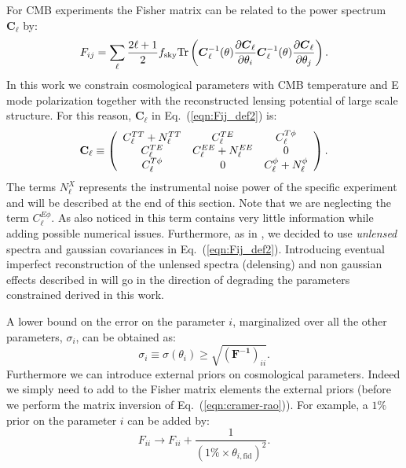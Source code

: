 \documentclass[aps,prd,reprint,superscriptaddress]{revtex4-1}
\newcommand\refeq[1]{Eq.~(\ref{eqn:#1})}
\begin{document}
For CMB experiments the Fisher matrix can be related to the power spectrum $\boldsymbol{C}_\ell$ by:
\begin{equation}
 F_{ij} = \sum_\ell \frac{2\ell+1}{2} f_{\rm sky} {\rm Tr} \left(  \boldsymbol{C}^{-1}_\ell( \theta) \frac{\partial \boldsymbol{C}_\ell}{\partial \theta_i} \boldsymbol{C}^{-1}_\ell( \theta) \frac{\partial \boldsymbol{C}_\ell}{\partial \theta_j}  \right).
 \label{eqn:Fij_def2}
 \end{equation}
In this work we constrain cosmological parameters with CMB temperature and E mode polarization together with the reconstructed lensing potential of large scale structure. For this reason, $\boldsymbol{C}_\ell$ in \refeq{Fij_def2} is:
 \begin{eqnarray}
 	\centering
		\mathbf{C}_\ell \equiv \left( \begin{array}{ccc}C_\ell^{TT} + N_\ell^{TT} & C_\ell^{TE} & C_\ell^{T\phi} \\ C_\ell^{TE} & C_\ell^{EE} + N_\ell^{EE} & 0 \\ C_\ell^{T\phi} & 0 & C_\ell^{\phi} + N_\ell^{\phi}\end{array}\right).
	\label{eqn:cov_definition}
\end{eqnarray}
The terms $N_\ell^{X}$ represents the instrumental noise power of the specific experiment and will be described at the end of this section.
Note that we are neglecting the term $C_\ell^{E\phi}$. As also noticed in  \cite{wu:2014,2013PhRvD..87h3008H} this term contains very little information while adding possible numerical issues.
Furthermore, as in \cite{wu:2014}, we decided to use \textit{unlensed} spectra and gaussian covariances in \refeq{Fij_def2}. Introducing eventual imperfect reconstruction of the unlensed spectra (delensing) and non gaussian effects described in \cite{benoit-levy:2012} will go in the direction of degrading the parameters constrained derived in this work.

A lower bound on the error on the parameter $i$, marginalized over all the other parameters, $\sigma_i$, can be obtained as:
\begin{equation}
\sigma_i \equiv \sigma (\theta_i) \geq \sqrt{(\mathbf{ F^{-1}})_{ii}}.
\label{eqn:cramer-rao}
\end{equation}
Furthermore we can introduce external priors on cosmological parameters.
Indeed we simply need to add to the Fisher matrix elements the external priors (before we perform the matrix inversion of \refeq{cramer-rao}).
For example, a $1\%$ prior on the parameter $i$ can be added by:
\begin{equation}
F_{ii} \rightarrow F_{ii} + \frac{1}{(1\% \times  \theta_{i,\text{fid}})^2}.
\end{equation}
\end{document}
